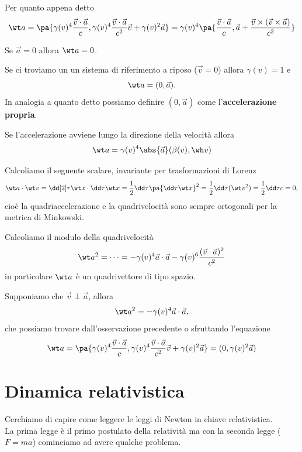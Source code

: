 \begin{remark}
Per quanto appena detto
\[\wt a=\pa{\gamma(v)^4\frac{\vec v\cdot \vec a}{c},\gamma(v)^4\frac{\vec v\cdot \vec a}{c^2}\vec v+\gamma(v)^2\vec a}=\gamma(v)^4\pa{\frac{\vec v\cdot \vec a}{c},\vec a+\frac{\vec v\times(\vec v\times \vec a)}{c^2}}\]
\end{remark}

\begin{remark}
Se $\vec a=0$ allora $\wt a=0$.
\end{remark}

\begin{remark}
Se ci troviamo un un sistema di riferimento a riposo ($\vec v=0$) allora $\gamma(v)=1$ e
\[\wt a=(0,\vec a).\]
In analogia a quanto detto possiamo definire $(0,\vec a)$ come l'\textbf{accelerazione propria}.
\end{remark}

\begin{remark}
Se l'accelerazione avviene lungo la direzione della velocit\`a allora
\[\wt a=\gamma(v)^4\abs{\vec a}(\beta(v),\wh v)\]
\end{remark}

\begin{remark}
Calcoliamo il seguente scalare, invariante per trasformazioni di Lorenz
\[\wt a\cdot \wt v=\dd[2]\tau{\wt x}\cdot \dd \tau{\wt x}=\frac12\dd\tau{}\pa{\dd \tau{\wt x}}^2=\frac 12\dd\tau{}(\wt v^2)=\frac 12\dd\tau c=0,\]
cio\`e la quadriaccelerazione e la quadrivelocit\`a sono sempre ortogonali per la metrica di Minkowski.
\end{remark}

\begin{remark}
Calcoliamo il modulo della quadrivelocit\`a
\[\wt a^2=\cdots=-\gamma(v)^4\vec a\cdot\vec a-\gamma(v)^6\frac{(\vec v\cdot \vec a)^2}{c^2}\]
in particolare $\wt a$ \`e un quadrivettore di tipo spazio.
\end{remark}

\begin{remark}
Supponiamo che $\vec v\perp \vec a$, allora
\[\wt a^2=-\gamma(v)^4\vec a\cdot \vec a,\]
che possiamo trovare dall'osservazione precedente o sfruttando l'equazione \[\wt a=\pa{\gamma(v)^4\frac{\vec v\cdot \vec a}{c},\gamma(v)^4\frac{\vec v\cdot \vec a}{c^2}\vec v+\gamma(v)^2\vec a}=(0,\gamma(v)^2\vec a)\]
\end{remark}




\section{Dinamica relativistica}
Cerchiamo di capire come leggere le leggi di Newton in chiave relativistica.\\
La prima legge \`e il primo postulato della relativit\`a ma con la seconda legge ($F=ma$) cominciamo ad avere qualche problema.\medskip

